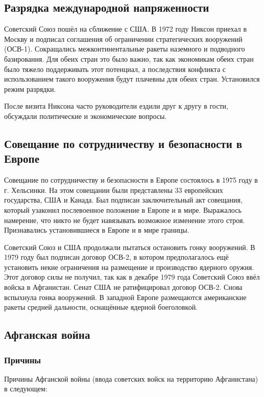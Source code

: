     \subsection{Разрядка международной напряженности}
    
    Советский Союз пошёл на сближение с США. В 1972 году Никсон приехал в Москву и подписал соглашения об ограничении стратегических вооружений (ОСВ-1). Сокращались межконтинентальные ракеты наземного и подводного базирования. Для обеих стран это было важно, так как экономикам обеих стран было тяжело поддерживать этот потенциал, а последствия конфликта с использованием такого вооружения будут плачевны для обеих стран. Установился режим разрядки.
    
    После визита Никсона часто руководители ездили друг к другу в гости, обсуждали политические и экономические вопросы.

    \subsection{Совещание по сотрудничеству и безопасности в Европе}
    
    Совещание по сотрудничеству и безопасности в Европе состоялось в 1975 году в г. Хельсинки. На этом совещании были представлены 33 европейских государства, США и Канада. Был подписан заключительный акт совещания, который узаконил послевоенное положение в Европе и в мире. Выражалось намерение, что никто не будет навязывать возможное изменение этого строя. Признавались установившиеся в Европе и в мире границы.
    
    Советский Союз и США продолжали пытаться остановить гонку вооружений. В 1979 году был подписан договор ОСВ-2, в котором предполагалось ещё установить некие ограничения на размещение и производство ядерного оружия. Этот договор силы не получил, так как в декабре 1979 года Советский Союз ввёл войска в Афганистан. Сенат США не ратифицировал договор ОСВ-2. Снова вспыхнула гонка вооружений. В западной Европе размещаются американские ракеты средней дальности, оснащённые ядерной боеголовкой.

    \subsection{Афганская война}

    \subsubsection{Причины}
    Причины Афганской войны (ввода советских войск на территорию Афганистана) в следующем:

